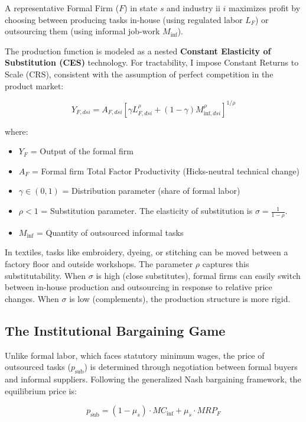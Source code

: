 A representative Formal Firm ($F$) in state $s$ and industry ii
$i$ maximizes profit by choosing between producing tasks in-house (using regulated labor $L_F$) or outsourcing them (using informal job-work $M_{\text{inf}}$).


The production function is modeled as a nested \textbf{Constant Elasticity of Substitution (CES)} technology. For tractability, I impose Constant Returns to Scale (CRS), consistent with the assumption of perfect competition in the product market:

\begin{equation}
	Y_{F,dsi} = A_{F,dsi} \left[ \gamma L_{F,dsi}^\rho + (1-\gamma) M_{\text{inf},dsi}^\rho \right]^{1/\rho}
\end{equation}

where:
\begin{itemize}
	\item $Y_F$ = Output of the formal firm
	\item $A_F$ = Formal firm Total Factor Productivity (Hicks-neutral technical change)
	\item $\gamma \in (0,1)$ = Distribution parameter (share of formal labor)
	\item $\rho < 1$ = Substitution parameter. The elasticity of substitution is $\sigma = \frac{1}{1-\rho}$.
	\item $M_{\text{inf}}$ = Quantity of outsourced informal tasks
\end{itemize}

In textiles, tasks like embroidery, dyeing, or stitching can be moved between a factory floor and outside workshops. The parameter $\rho$ captures this substitutability. When $\sigma$ is high (close substitutes), formal firms can easily switch between in-house production and outsourcing in response to relative price changes. When $\sigma$ is low (complements), the production structure is more rigid.

\subsection{The Institutional Bargaining Game}

Unlike formal labor, which faces statutory minimum wages, the price of outsourced tasks ($p_{\text{sub}}$) is determined through negotiation between formal buyers and informal suppliers. Following the generalized Nash bargaining framework, the equilibrium price is:

\begin{equation}
	p_{\text{sub}} = (1 - \mu_s) \cdot MC_{\text{inf}} + \mu_s \cdot MRP_F
\end{equation}

